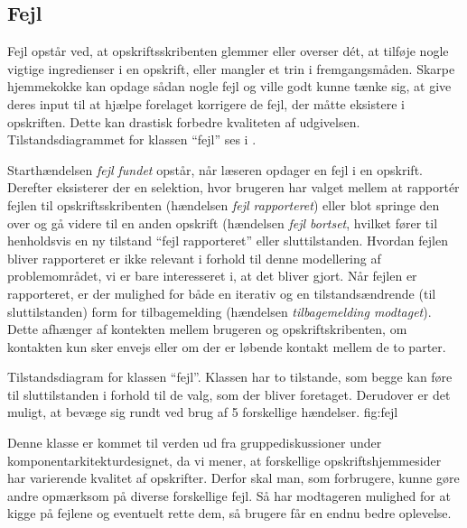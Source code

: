 \subsection{Fejl}
Fejl opstår ved, at opskriftsskribenten glemmer eller overser d\'{e}t, at tilføje nogle vigtige ingredienser i en opskrift, eller \fx mangler et trin i fremgangsmåden. Skarpe hjemmekokke kan opdage sådan nogle fejl og ville godt kunne tænke sig, at give deres input til at hjælpe forelaget korrigere de fejl, der måtte eksistere i opskriften. Dette kan drastisk forbedre kvaliteten af udgivelsen. Tilstandsdiagrammet for klassen ``fejl'' ses i .

Starthændelsen \textit{fejl fundet} opstår, når læseren opdager en fejl i en opskrift. Derefter eksisterer der en selektion, hvor brugeren har valget mellem at rapport\'{e}r fejlen til opskriftsskribenten (hændelsen \textit{fejl rapporteret}) eller blot springe den over og gå videre til en anden opskrift (hændelsen \textit{fejl bortset}, hvilket fører til henholdsvis en ny tilstand ``fejl rapporteret'' eller sluttilstanden. Hvordan fejlen bliver rapporteret er ikke relevant i forhold til denne modellering af problemområdet, vi er bare interesseret i, at det bliver gjort. Når fejlen er rapporteret, er der mulighed for både en iterativ og en tilstandsændrende (til sluttilstanden) form for tilbagemelding (hændelsen \textit{tilbagemelding modtaget}). Dette afhænger af kontekten mellem brugeren og opskriftskribenten, om kontakten kun sker envejs eller om der er løbende kontakt mellem de to parter.

{Tilstandsdiagram for klassen ``fejl''. Klassen har to tilstande, som begge kan føre til sluttilstanden i forhold til de valg, som der bliver foretaget. Derudover er det muligt, at bevæge sig rundt ved brug af 5 forskellige hændelser.}
  {fig:fejl}

Denne klasse er kommet til verden ud fra gruppediskussioner under komponentarkitekturdesignet, da vi mener, at forskellige opskriftshjemmesider har varierende kvalitet af opskrifter. Derfor skal man, som forbrugere, kunne gøre andre opmærksom på diverse forskellige fejl. Så har modtageren mulighed for at kigge på fejlene og eventuelt rette dem, så brugere får en endnu bedre oplevelse.
